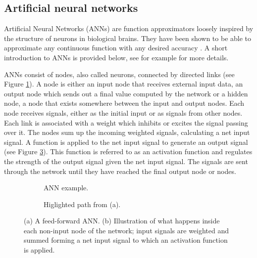 \newpage
\subsection{Artificial neural networks}
Artificial Neural Networks (ANNs) are function approximators loosely inspired by the structure
of neurons in biological brains.
They have been shown to be able to approximate any continuous function with any desired accuracy \cite{universality_formal,universality_informal}.
A short introduction to ANNs is provided below, see for example \cite{compint} for more details.

ANNs consist of nodes, also called neurons, connected by directed links (see Figure \ref{feedforward}).
A node is either an input node that receives external input data, an output node which sends out a final value computed
by the network or a hidden node, a node that exists somewhere between the input and output nodes. Each node receives signals, either
as the initial input or as signals from other nodes. Each link is associated with a weight which inhibits or excites the signal
passing over it. The nodes sum up the incoming weighted signals, calculating a net input signal. A function is applied to the net input
signal to generate an output signal (see Figure \ref{neuron}). This function is referred to as an activation function and regulates the strength of the output
signal given the net input signal. The signals are sent through the network until they have reached the final output node or nodes.


\begin{figure}[htb]
    \begin{mdframed}
        \begin{subfigure}[b]{0.5\textwidth}
            \centering
            \resizebox{0.7\textwidth}{!}{}
            \caption{ANN example.}
            \label{feedforward}
        \end{subfigure}
        \begin{subfigure}[b]{0.5\textwidth}
            \centering
            \resizebox{0.9\textwidth}{!}{}
            \caption{Higlighted path from (a).}
            \label{neuron}
        \end{subfigure}
    \end{mdframed}
    \caption{(a) A feed-forward ANN. (b) Illustration of what happens inside each non-input node of the network; input
                 signals are weighted and summed forming a net input signal to which an activation function is applied.}
\end{figure}

